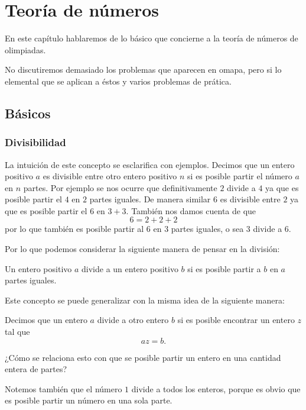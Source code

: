 \part{Teoría de números}
En este capítulo hablaremos de
lo básico que concierne a la
teoría de números de olimpiadas.

No discutiremos demasiado los
problemas que aparecen en omapa,
pero si lo elemental que se aplican
a éstos y varios problemas de prática.

\chapter{Básicos}
\section{Divisibilidad}
La intuición de este concepto
se esclarifica con ejemplos.
Decimos que un entero positivo $a$
es divisible entre otro entero
positivo $n$ si es posible
partir el número $a$ en $n$ partes.
Por ejemplo se nos ocurre que definitivamente
$2$ divide a $4$ ya que es posible
partir el $4$ en $2$ partes iguales.
De manera similar $6$ es divisible
entre $2$ ya que es posible partir
el $6$ en $3 + 3$.
También nos damos cuenta de que
\[6 = 2 + 2 + 2\]
por lo que también es posible partir
al $6$ en $3$ partes iguales, o sea
$3$ divide a $6$.

Por lo que podemos considerar
la siguiente manera de pensar en la
división:

\begin{intuition*}
	Un entero positivo $a$ divide a
	un entero positivo $b$ si es posible
	partir a $b$ en $a$ partes iguales.
\end{intuition*}

Este concepto se puede generalizar
con la misma idea de la siguiente manera:

\begin{definition}
	\label{definition:div}
	Decimos que un entero $a$ divide
	a otro entero $b$ si es posible
	encontrar un entero $z$ tal que
	\[az = b.\]
\end{definition}

\begin{question*}
	¿Cómo se relaciona esto con que
	se posible partir un entero en
	una cantidad entera de partes?
\end{question*}

Notemos también que el número $1$
divide a todos los enteros, porque
es obvio que es posible partir un número
en una sola parte.


